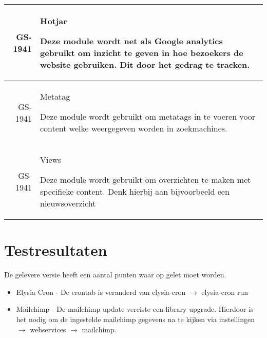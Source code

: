 \documentclass[12pt]{article}
\begin{document}
\begin{tabular}{| r | p{15cm} |}
  GS-1941 & Hotjar

  Deze module wordt net als Google analytics gebruikt om inzicht te geven in hoe bezoekers de website gebruiken. Dit door het gedrag te tracken. \\ \hline

  GS-1941 & Metatag

  Deze module wordt gebruikt om metatags in te voeren voor content welke weergegeven worden in zoekmachines. \\ \hline

  GS-1941 & Views

  Deze module wordt gebruikt om overzichten te maken met specifieke content. Denk hierbij aan bijvoorbeeld een nieuwsoverzicht \\ \hline
\end{tabular}

\section{Testresultaten}
  De gelevere versie heeft een aantal punten waar op gelet moet worden.
  \begin{itemize}
    \item Elysia Cron - De crontab is veranderd van elysia-cron $\rightarrow$ elysia-cron run
    \item Mailchimp - De mailchimp update vereiste een library upgrade. Hierdoor is het nodig om de ingestelde mailchimp gegevens na te kijken via instellingen $\rightarrow$ webservices $\rightarrow$ mailchimp.
  \end{itemize}
\end{document}
